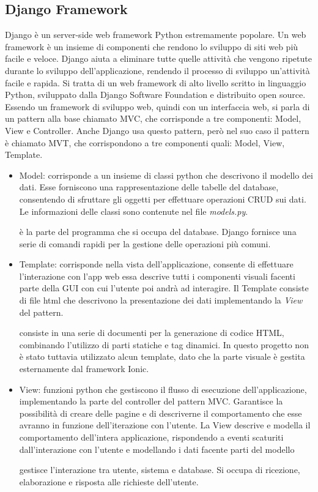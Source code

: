 \documentclass{article}
\begin{document}
\subsection{Django Framework}
Django è un server-side web framework Python estremamente popolare. Un web framework è un insieme di componenti che rendono lo sviluppo di siti web più facile e veloce. 
Django aiuta a eliminare tutte quelle attività che vengono ripetute durante lo sviluppo dell'applicazione, rendendo il processo di sviluppo un'attività facile e rapida. 
Si tratta di un web framework di alto livello scritto in linguaggio Python, sviluppato dalla Django Software Foundation e distribuito open source. 
Essendo un framework di sviluppo web, quindi con un interfaccia web, si parla di un pattern alla base chiamato MVC, che corrisponde a tre componenti: Model, View e Controller.
Anche Django usa questo pattern, però nel suo caso il pattern è chiamato MVT, che corrispondono a tre componenti quali: Model, View, Template.
\begin{itemize}
\item Model: corrisponde a un insieme di classi python che descrivono il modello dei dati. Esse forniscono una rappresentazione delle tabelle del database, consentendo di sfruttare gli oggetti per effettuare operazioni CRUD sui dati. Le informazioni delle classi sono contenute nel file \textit{models.py}.


è la parte del programma che si occupa del database. Django fornisce una serie di comandi rapidi per la gestione delle operazioni più comuni.
\item Template: corrisponde nella vista dell'applicazione, consente di effettuare l'interazione con l'app web essa descrive tutti i componenti visuali facenti parte della GUI con cui l'utente poi andrà ad interagire.
Il Template consiste di file html che descrivono la presentazione dei dati implementando la \textit{View} del pattern. 

consiste in una serie di documenti per la generazione di codice HTML, combinando l'utilizzo di parti statiche e tag dinamici. In questo progetto non è stato tuttavia utilizzato alcun template, dato che la parte visuale è gestita esternamente dal framework Ionic. 
\item View: funzioni python che gestiscono il flusso di esecuzione dell'applicazione, implementando la parte del controller del pattern MVC. Garantisce la possibilità di creare delle pagine e di descriverne il comportamento che esse avranno in funzione dell'iterazione con l'utente.
La View descrive e modella il comportamento dell'intera applicazione, rispondendo a eventi scaturiti dall'interazione con l'utente e modellando i dati facente parti del modello


gestisce l'interazione tra utente, sistema e database. Si occupa di ricezione, elaborazione e risposta alle richieste dell'utente.
\end{itemize}
\end{document}
